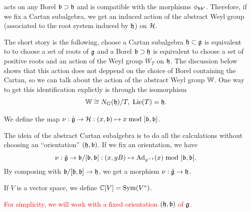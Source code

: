acts on any Borel $\mathfrak{b}\supset\mathfrak{h}$ and is compatible with the morphisms $\phi_{\mathfrak{b}\mathfrak{b^\prime}}$. Therefore, if 
we fix a Cartan subalgebra, we get an induced action of the abstract Weyl group (associated to the root system 
induced by $\mathfrak{h}$) on $\mathcal{H}$.\par 
The short story is the following, choose a Cartan subalgebra $\mathfrak{h}\subset \mathfrak{g}$ is equivalent to 
to choose a set of roots of $\mathfrak{g}$ and a Borel $\mathfrak{b}\supset\mathfrak{h}$ is equivalent to choose 
a set of positive roots and an action of the Weyl group $W_T$ on $\mathfrak{h}$. The discussion below shows that 
this action does not deppend on the choice of Borel containing the Cartan, so we can talk about the action of 
the abstract Weyl group $\mathbb{W}$. One way to get this identification explictly is through the isomorphism
\begin{equation}
    \mathbb{W} \cong N_G(\mathfrak{h})/ T,\;\text{Lie}(T) =\mathfrak{h}.
\end{equation}

\begin{dang}
    \begin{definition}
        We define the map $\nu:\tilde{\mathfrak{g}}\to\mathcal{H}:(x,\mathfrak{b})\mapsto x\;\text{mod }[\mathfrak{b},\mathfrak{b}]$.
    \end{definition}
\end{dang}

The ideia of the abstract Cartan subalgebra is to do all the calculations without choosing an ``orientation'' 
$(\mathfrak{h},\mathfrak{b})$. If we fix an orientation, we have 
\begin{equation}
    \nu: \tilde{\mathfrak{g}}\to \mathfrak{b}/[\mathfrak{b},\mathfrak{b}]: (x,gB)\mapsto \text{Ad}_{g^{-1}}(x)\;\text{mod }[\mathfrak{b},\mathfrak{b}].
\end{equation}
By composing with $\mathfrak{b}/[\mathfrak{b},\mathfrak{b}]\to \mathfrak{h}$, we get a morphism $\nu:\tilde{\mathfrak{g}}\to\mathfrak{h}$.


\begin{remark}
    If $V$ is a vector space, we define $\mathbb{C}[V]=\text{Sym}(V^*)$.
\end{remark}

\begin{center}
    \textcolor{red}{For simplicity, we will work with a fixed orientation $(\mathfrak{h},\mathfrak{b})$ of $\mathfrak{g}$.}
\end{center}


